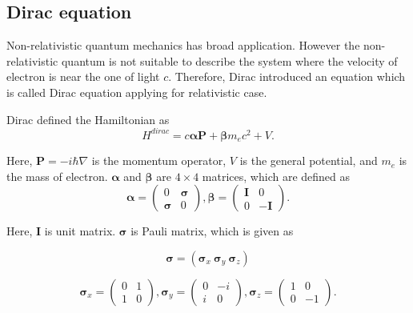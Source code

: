 \documentclass[a4paper, 12pt, titlepage,oneside,drop]{kthesis}
\begin{document}
\subsection{Dirac equation}

Non-relativistic quantum mechanics has broad application. However the non-relativistic quantum is not suitable to describe the system where the velocity of electron is near the one of light $c$. 
Therefore, Dirac introduced an equation which is called Dirac equation applying for relativistic case.

\noindent Dirac defined the Hamiltonian as
\begin{equation}\label{dirac}
{H}^{dirac} = c \boldsymbol{\alpha} \textbf{P} + \boldsymbol{\beta}m_ec^{2} + V.
\end{equation}

\noindent Here, $\textbf{P} = -i\hbar \nabla $ is the momentum operator, $V$ is the general potential, and $m_e$ is the mass of electron. 
 $\boldsymbol{\alpha}$ and $\boldsymbol{\beta}$ are $4 \times 4$ matrices, which are defined as
\begin{equation}
 \boldsymbol{\alpha} = \left( \begin{array}{cc}
 0 & \boldsymbol{\sigma}  \\
 \boldsymbol{\sigma} & 0   \end{array} \right),
\boldsymbol{\beta} = \left( \begin{array}{ccc}
\boldsymbol{I} & 0\\
0 & -\boldsymbol{I}\end{array} \right).
\end{equation}

\noindent Here, $\boldsymbol{I}$ is unit matrix. $\boldsymbol{\sigma}$ is Pauli matrix, which is given as

\begin{equation} 
\boldsymbol{\sigma} = (\boldsymbol{\sigma}_x \  \boldsymbol{\sigma}_y \  \boldsymbol{\sigma}_z )  
\end{equation}

\begin{equation}
\boldsymbol{\sigma}_x = \left( \begin{array}{cc}
0 & 1\\
1 & 0\end{array} \right),
\boldsymbol{\sigma}_y = \left( \begin{array}{ccc}
0 & -i\\
i & 0\end{array} \right),
\boldsymbol{\sigma}_z = \left( \begin{array}{ccc}
1 & 0\\
0 & -1\end{array} \right).
\end{equation}
\end{document}
